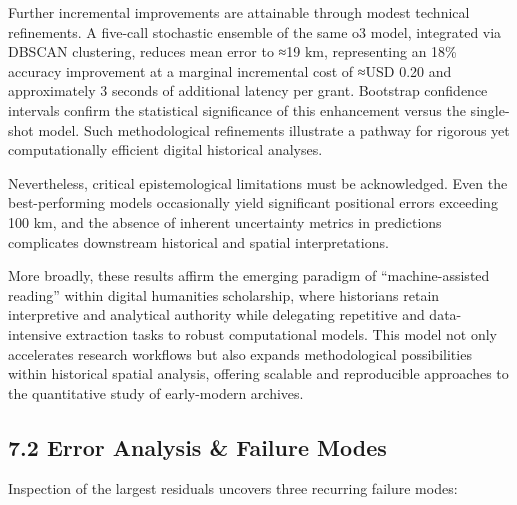 \documentclass[
  10pt]{article}
\begin{document}
Further incremental improvements are attainable through modest technical
refinements. A five-call stochastic ensemble of the same o3 model,
integrated via DBSCAN clustering, reduces mean error to ≈19 km,
representing an 18\% accuracy improvement at a marginal incremental cost
of ≈USD 0.20 and approximately 3 seconds of additional latency per
grant. Bootstrap confidence intervals confirm the statistical
significance of this enhancement versus the single-shot model. Such
methodological refinements illustrate a pathway for rigorous yet
computationally efficient digital historical analyses.

Nevertheless, critical epistemological limitations must be acknowledged.
Even the best-performing models occasionally yield significant
positional errors exceeding 100 km, and the absence of inherent
uncertainty metrics in predictions complicates downstream historical and
spatial interpretations.

More broadly, these results affirm the emerging paradigm of
``machine-assisted reading'' within digital humanities scholarship,
where historians retain interpretive and analytical authority while
delegating repetitive and data-intensive extraction tasks to robust
computational models. This model not only accelerates research workflows
but also expands methodological possibilities within historical spatial
analysis, offering scalable and reproducible approaches to the
quantitative study of early-modern archives.

\subsection{7.2 Error Analysis \& Failure
Modes}\label{error-analysis-failure-modes}

Inspection of the largest residuals uncovers three recurring failure
modes:
\end{document}
